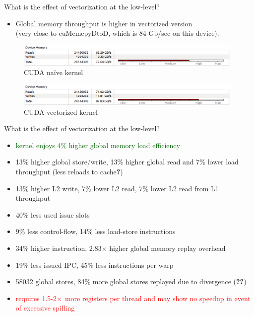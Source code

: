 \documentclass[aspectratio=169]{beamer}
\begin{document}
\begin{frame}[fragile]{What is the effect of vectorization at the low-level?}

\begin{itemize}
\item Global memory throughput is higher in vectorized version\\ (very close to cuMemcpyDtoD, which is 84 Gb/sec on this device).
\end{itemize}

\begin{figure}
\includegraphics[width=11cm]{figures/cuda_gmem}
\caption{CUDA na\"{i}ve kernel}
\end{figure}
\vskip-25pt
\begin{figure}
\includegraphics[width=11cm]{figures/cuda_vec2_gmem}
\caption{CUDA vectorized kernel}
\end{figure}

\end{frame}



\begin{frame}[fragile]{What is the effect of vectorization at the low-level?}


\begin{itemize}
\item \textcolor{darkgreen}{kernel enjoys 4\% higher global memory load efficiency}
\item 13\% higher global store/write, 13\% higher global read and 7\% lower load throughput (less reloads to cache\textbf{?})
\item 13\% higher L2 write, 7\% lower L2 read, 7\% lower L2 read from L1 throughput
\item 40\% less used issue slots
\item 9\% less control-flow, 14\% less load-store instructions
\item 34\% higher instruction, 2.83$\times$ higher global memory replay overhead
\item 19\% less issued IPC, 45\% less instructions per warp
\item 58032 global stores, 84\% more global stores replayed due to divergence (\textbf{??})
\item \textcolor{red}{requires 1.5-2$\mathbin{\textcolor{red}{\times}}$ more registers per thread and may show no speedup in event of excessive spilling}
\end{itemize}

\end{frame}
\end{document}
